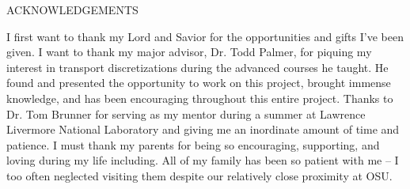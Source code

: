\documentclass[12pt]{article}
\begin{document}
\begin{center}
ACKNOWLEDGEMENTS
\end{center}

I first want to thank my Lord and Savior for the opportunities and gifts I've been given. I want to thank my major advisor, Dr. Todd Palmer, for piquing my interest in transport discretizations during the advanced courses he taught. He found and presented the opportunity to work on this project, brought immense knowledge, and has been encouraging throughout this entire project. Thanks to Dr. Tom Brunner for serving as my mentor during a summer at Lawrence Livermore National Laboratory and giving me an inordinate amount of time and patience. I must thank my parents for being so encouraging, supporting, and loving during my life including. All of my family has been so patient with me -- I too often neglected visiting them despite our relatively close proximity at OSU.
\end{document}
